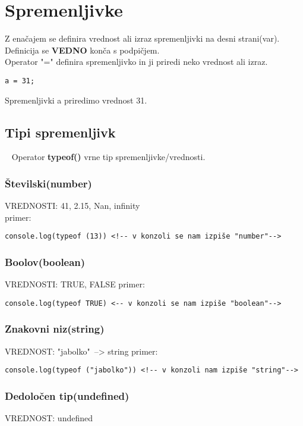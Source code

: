 \section{Spremenljivke}

{\centering{}\par}
Z enačajem se definira vrednost ali izraz spremenljivki na desni strani(var). Definicija se \textbf{VEDNO} konča s podpičjem.\\

Operator "=" definira spremenljivko in ji priredi neko vrednost ali izraz.

\texttt{a = 31;}

Spremenljivki a priredimo vrednost 31.\\

\subsection{Tipi spremenljivk}\
\newline
Operator \textbf{typeof()} vrne tip spremenljivke/vrednosti.\


\subsubsection*{Številski(number)}
VREDNOSTI: 41, 2.15, Nan, infinity\\
primer:
\begin{verbatim}
console.log(typeof (13)) <!-- v konzoli se nam izpiše "number"-->
\end{verbatim}

\subsubsection*{Boolov(boolean)}
VREDNOSTI: TRUE, FALSE
primer:
\begin{verbatim}
console.log(typeof TRUE) <-- v konzoli se nam izpiše "boolean"-->
\end{verbatim}

\subsubsection*{Znakovni niz(string)}
VREDNOST: "jabolko"\ --> string
primer:
\begin{verbatim}
console.log(typeof ("jabolko")) <!-- v konzoli nam izpiše "string"-->
\end{verbatim}

\subsubsection*{Dedoločen tip(undefined)}
VREDNOST: undefined

